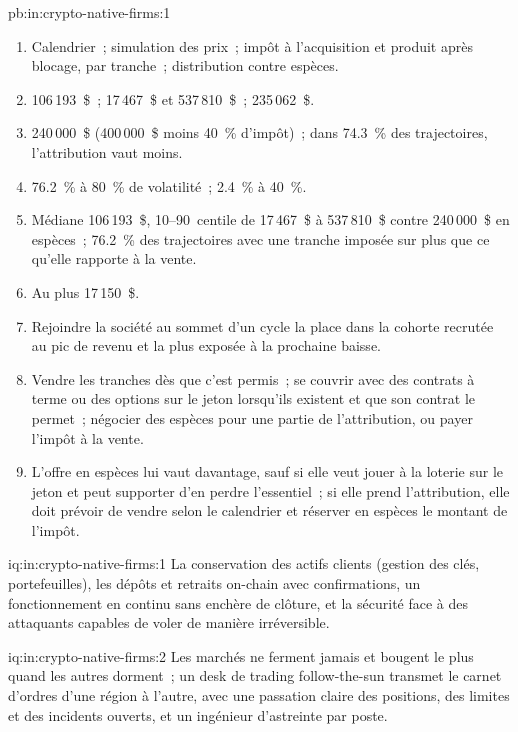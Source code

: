 \begin{solution}{pb:in:crypto-native-firms:1}
\begin{enumerate}
\item Calendrier~; simulation des prix~; impôt à l'acquisition et produit après blocage, par tranche~; distribution contre espèces.
\item 106\,193~\$~; 17\,467~\$ et 537\,810~\$~; 235\,062~\$.
\item 240\,000~\$ (400\,000~\$ moins 40~\% d'impôt)~; dans 74.3~\% des trajectoires, l'attribution vaut moins.
\item 76.2~\% à 80~\% de volatilité~; 2.4~\% à 40~\%.
\item Médiane 106\,193~\$, 10--90~centile de 17\,467~\$ à 537\,810~\$ contre 240\,000~\$ en espèces~; 76.2~\% des trajectoires avec une
tranche imposée sur plus que ce qu'elle rapporte à la vente.
\item Au plus 17\,150~\$.
\item Rejoindre la société au sommet d'un cycle la place dans la cohorte recrutée au pic de revenu et la plus exposée à la prochaine baisse.
\item Vendre les tranches dès que c'est permis~; se couvrir avec des contrats à terme ou des options sur le jeton lorsqu'ils existent et que son contrat
le permet~; négocier des espèces pour une partie de l'attribution, ou payer l'impôt à la vente.
\item L'offre en espèces lui vaut davantage, sauf si elle veut jouer à la loterie sur le jeton et peut supporter d'en perdre l'essentiel~; si elle
prend l'attribution, elle doit prévoir de vendre selon le calendrier et réserver en espèces le montant de l'impôt.
\end{enumerate}
\end{solution}

\begin{solution}{iq:in:crypto-native-firms:1}
La conservation des actifs clients (gestion des clés, portefeuilles), les dépôts et retraits on-chain avec confirmations, un fonctionnement en continu
sans enchère de clôture, et la sécurité face à des attaquants capables de voler de manière irréversible.
\end{solution}

\begin{solution}{iq:in:crypto-native-firms:2}
Les marchés ne ferment jamais et bougent le plus quand les autres dorment~; un desk de trading follow-the-sun transmet le carnet d'ordres d'une région à l'autre, avec une
passation claire des positions, des limites et des incidents ouverts, et un ingénieur d'astreinte par poste.
\end{solution}

